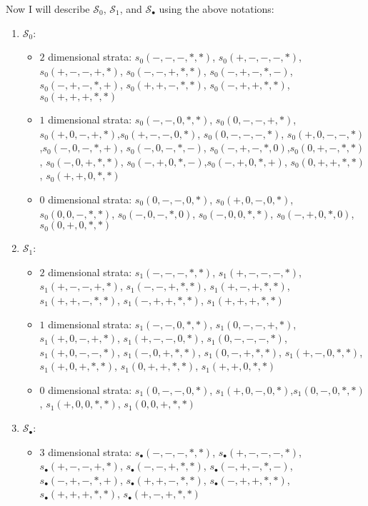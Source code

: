 \begin{definition}
Now I will describe $\mathcal{S}_0$, $\mathcal{S}_1$, and $\mathcal{S}_\bullet$ using the above notations:
\begin{enumerate}
\item $\mathcal{S}_0$:
\begin{itemize}
\item $2$ dimensional strata: $s_0(-,-,-,*,*)$, $s_0(+,-,-,-,*)$, $s_0(+,-,-,+,*)$, $s_0(-,-,+,*,*)$, $s_0(-,+,-,*,-)$, $s_0(-,+,-,*,+)$, $s_0(+,+,-,*,*)$, $s_0(-,+,+,*,*)$, $s_0(+,+,+,*,*)$

\item $1$ dimensional strata: $s_0(-,-,0,*,*)$, $s_0(0,-,-,+,*)$, $s_0(+,0,-,+,*)$,$s_0(+,-,-,0,*)$, $s_0(0,-,-,-,*)$, $s_0(+,0,-,-,*)$,$s_0(-,0,-,*,+)$, $s_0(-,0,-,*,-)$, $s_0(-,+,-,*,0)$,$s_0(0,+,-,*,*)$, $s_0(-,0,+,*,*)$, $s_0(-,+,0,*,-)$,$s_0(-,+,0,*,+)$, $s_0(0,+,+,*,*)$, $s_0(+,+,0,*,*)$

\item $0$ dimensional strata: $s_0(0,-,-,0,*)$, $s_0(+,0,-,0,*)$, $s_0(0,0,-,*,*)$, $s_0(-,0,-,*,0)$, $s_0(-,0,0,*,*)$, $s_0(-,+,0,*,0)$, $s_0(0,+,0,*,*)$
\end{itemize}

\item $\mathcal{S}_1$:
\begin{itemize}
\item $2$ dimensional strata: $s_1(-,-,-,*,*)$, $s_1(+,-,-,-,*)$, $s_1(+,-,-,+,*)$, $s_1(-,-,+,*,*)$, $s_1(+,-,+,*,*)$, $s_1(+,+,-,*,*)$, $s_1(-,+,+,*,*)$, $s_1(+,+,+,*,*)$

\item $1$ dimensional strata: $s_1(-,-,0,*,*)$, $s_1(0,-,-,+,*)$, $s_1(+,0,-,+,*)$, $s_1(+,-,-,0,*)$, $s_1(0,-,-,-,*)$, $s_1(+,0,-,-,*)$, $s_1(-,0,+,*,*)$, $s_1(0,-,+,*,*)$, $s_1(+,-,0,*,*)$,$s_1(+,0,+,*,*)$, $s_1(0,+,+,*,*)$, $s_1(+,+,0,*,*)$

\item $0$ dimensional strata: $s_1(0,-,-,0,*)$, $s_1(+,0,-,0,*)$,$s_1(0,-,0,*,*)$, $s_1(+,0,0,*,*)$, $s_1(0,0,+,*,*)$
\end{itemize}

\item $\mathcal{S}_\bullet$:
\begin{itemize}
\item $3$ dimensional strata: $s_\bullet(-,-,-,*,*)$, $s_\bullet(+,-,-,-,*)$, $s_\bullet(+,-,-,+,*)$, $s_\bullet(-,-,+,*,*)$, $s_\bullet(-,+,-,*,-)$, $s_\bullet(-,+,-,*,+)$, $s_\bullet(+,+,-,*,*)$, $s_\bullet(-,+,+,*,*)$, $s_\bullet(+,+,+,*,*)$, $s_\bullet(+,-,+,*,*)$


\end{itemize}
\end{enumerate}
\end{definition}
